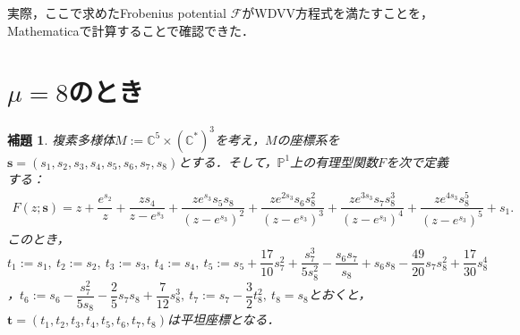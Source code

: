 \documentclass[a4paper,11pt]{jbook}
\theoremstyle{plain}
\newtheorem{lem}[thm]{補題}
\theoremstyle{definition}
\theoremstyle{remark}
\theoremstyle{proof}
\numberwithin{equation}{section}
\def\CC{{\mathbb C}}
\def\PP{{\mathbb P}}
\def\F{{\mathcal F}}
\begin{document}
実際，ここで求めたFrobenius potential $\F$がWDVV方程式を満たすことを，Mathematicaで計算することで確認できた．

\section{$\mu=8$のとき}%
\begin{lem}\label{flat8}
複素多様体$M:=\CC^5\times(\CC^*)^3$を考え，$M$の座標系を$\bm{s}=(s_1,s_2,s_3,s_4,s_5,s_6,s_7,s_8)$とする．そして，$\PP^1$上の有理型関数$F$を次で定義する：
\begin{align}F(z;\bm{s})=z+\dfrac{e^{s_2}}{z}+\dfrac{zs_4}{z-e^{s_3}}+\dfrac{ze^{s_3}s_5s_8}{(z-e^{s_3})^2}+\dfrac{ze^{2s_3}s_6s_8^2}{(z-e^{s_3})^3}+\dfrac{ze^{3s_3}s_7s_8^3}{(z-e^{s_3})^4}+\dfrac{ze^{4s_3}s_8^5}{(z-e^{s_3})^5}+s_1.\end{align}
このとき，$t_1:=s_1, \ t_2:=s_2, \ t_3:=s_3, \ t_4:=s_4, \ t_5:=s_5+\dfrac{17}{10}s_7^2+\dfrac{s_7^3}{5s_8^2}-\dfrac{s_6s_7}{s_8}+s_6s_8-\dfrac{49}{20}s_7s_8^2+\dfrac{17}{30}s_8^4$，$t_6:=s_6-\dfrac{s_7^2}{5s_8}-\dfrac{2}{5}s_7s_8+\dfrac{7}{12}s_8^3, \ t_7:=s_7-\dfrac{3}{2}t_8^2, \ t_8=s_8$とおくと，$\bm{t} =(t_1,t_2,t_3,t_4,t_5,t_6,t_7,t_8)$は平坦座標となる．
\end{lem}
\end{document}
